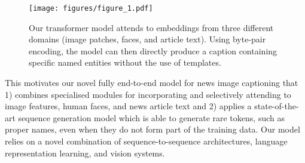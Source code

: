 \begin{figure}[t]
	\begin{center}
		\texttt{[image: figures/figure\_1.pdf]}
	\end{center}
	\caption{Our transformer model attends to embeddings from three different
		domains (image patches, faces, and article text). Using byte-pair
		encoding, the model can then directly produce a caption containing
		specific named entities without the use of templates.}
	\label{fig:long}
	\label{fig:teaser}
\end{figure}








This motivates our novel fully end-to-end
model for news image captioning that 1) combines specialised modules for
incorporating and selectively attending to image features, human faces, and
news article text and
2) applies a state-of-the-art sequence generation model which is able to
generate rare tokens, such as proper names, even when they do not form part of
the
training data. Our model relies on a novel combination of sequence-to-sequence
architectures, language representation learning, and
vision systems.



